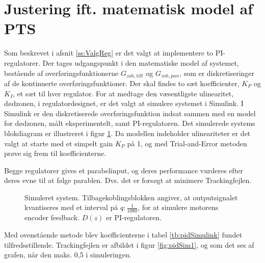 \section{Justering ift. matematisk model af PTS}
\label{ss:regulatorMat}
Som beskrevet i afsnit \ref{ss:ValgReg} er det valgt at implementere to PI-regulatorer.
Der tages udgangspunkt i den matematiske model af systemet, bestående af overføringsfunktionerne
\(G_{zoh,tilt}\) og \(G_{zoh,pan}\), som er diskretiseringer af de kontinuerte overføringsfunktioner.
Der skal findes to sæt koefficienter, \(K_P\) og \(K_I\), et sæt til hver regulator.
For at medtage den væsentligste ulinearitet, dødzonen, i regulatordesignet,
er det valgt at simulere systemet i Simulink.
I Simulink er den diskretiserede overføringsfunktion indsat sammen med en model for dødzonen,
målt eksperimentelt, samt PI-regulatoren. Det simulerede systems blokdiagram er illustreret i figur \ref{fig:simulink1}.
Da modellen indeholder ulineariteter er det valgt at starte med et simpelt gain \(K_P\) på 1,
og med Trial-and-Error metoden prøve sig frem til koefficienterne.


Begge regulatorer gives et parabelinput, og deres performance vurderes
efter deres evne til at følge parablen. Dvs. det er forsøgt at minimere Trackingfejlen.

\begin{figure}[!th]
\centering
\begin{tikzpicture}[auto, node distance=2.6cm,>=latex']

\end{tikzpicture}
\caption[Simuleret system]
		{Simuleret system. Tilbagekoblingsblokken angiver, at outputsignalet kvantiseres med et interval på \(q\mathrm{:} \frac{1}{1080}\),
		for at simulere motorens encoder feedback.
		\(D\left(z\right)\) er PI-regulatoren.}
\label{fig:simulink1}
\end{figure}


Med ovenstående metode blev koefficienterne i tabel \ref{tb:pidSimulink} fundet tilfredsstillende.
Trackingfejlen er afbildet i figur \ref{fig:pidSim1}, og som det ses af grafen, når den maks. 0,5\degree{} i simuleringen.

